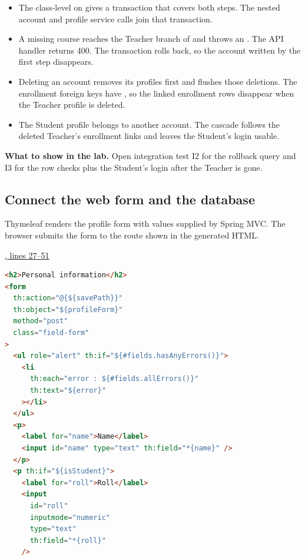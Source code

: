\begin{itemize}
\item The class-level  on  gives
 a transaction that covers both steps. The nested account
and profile service calls join that transaction.
\item A missing course reaches the Teacher branch of  and throws an
. The API handler returns 400. The transaction
rolls back, so the account written by the first step disappears.
\item Deleting an account removes its profiles first and flushes those deletions.
The enrollment foreign keys have , so the linked
enrollment rows disappear when the Teacher profile is deleted.
\item The Student profile belongs to another account. The cascade follows the
deleted Teacher's enrollment links and leaves the Student's login usable.
\end{itemize}

\textbf{What to show in the lab.}
Open integration test I2 for the rollback query and I3 for the row checks plus the
Student's login after the Teacher is gone.

\clearpage
\subsection{Connect the web form and the database}
Thymeleaf renders the profile form with values supplied by Spring MVC. The
browser submits the form to the route shown in the generated HTML.

\par\smallskip
{\small\href{\repo/blob/5d22aed7f6d4ef1e4c0b0c0dabf2962ba4b47608/src/main/resources/templates/profile.html#L27-L51}{, lines 27--51}}
\begin{lstlisting}[style=source,language=HTML,firstnumber=27]
<h2>Personal information</h2>
<form
  th:action="@{${savePath}}"
  th:object="${profileForm}"
  method="post"
  class="field-form"
>
  <ul role="alert" th:if="${#fields.hasAnyErrors()}">
    <li
      th:each="error : ${#fields.allErrors()}"
      th:text="${error}"
    ></li>
  </ul>
  <p>
    <label for="name">Name</label>
    <input id="name" type="text" th:field="*{name}" />
  </p>
  <p th:if="${isStudent}">
    <label for="roll">Roll</label>
    <input
      id="roll"
      inputmode="numeric"
      type="text"
      th:field="*{roll}"
    />
\end{lstlisting}


